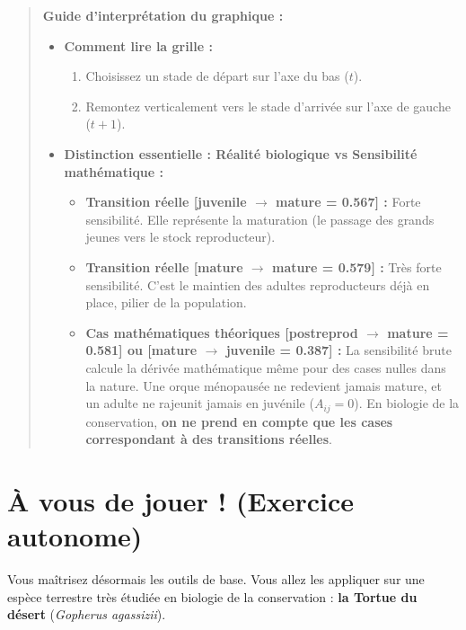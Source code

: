 \documentclass[
  french,
  a4paper,
  DIV=11,
  numbers=noendperiod,
  oneside]{scrreprt}
\providecommand{\tightlist}{%
  \setlength{\itemsep}{0pt}\setlength{\parskip}{0pt}}
\begin{document}
\begin{quote}
\textbf{Guide d'interprétation du graphique :}

\begin{itemize}
\tightlist
\item
  \textbf{Comment lire la grille :}

  \begin{enumerate}
  \def\labelenumi{\arabic{enumi}.}
  \tightlist
  \item
    Choisissez un stade de départ sur l'axe du bas (\(t\)).
  \item
    Remontez verticalement vers le stade d'arrivée sur l'axe de gauche
    (\(t+1\)).
  \end{enumerate}
\item
  \textbf{Distinction essentielle : Réalité biologique vs Sensibilité
  mathématique :}

  \begin{itemize}
  \tightlist
  \item
    \textbf{Transition réelle {[}juvenile \(\to\) mature = 0.567{]} :}
    Forte sensibilité. Elle représente la maturation (le passage des
    grands jeunes vers le stock reproducteur).
  \item
    \textbf{Transition réelle {[}mature \(\to\) mature = 0.579{]} :}
    Très forte sensibilité. C'est le maintien des adultes reproducteurs
    déjà en place, pilier de la population.
  \item
    \textbf{Cas mathématiques théoriques {[}postreprod \(\to\) mature =
    0.581{]} ou {[}mature \(\to\) juvenile = 0.387{]} :} La sensibilité
    brute calcule la dérivée mathématique même pour des cases nulles
    dans la nature. Une orque ménopausée ne redevient jamais mature, et
    un adulte ne rajeunit jamais en juvénile (\(A_{ij} = 0\)). En
    biologie de la conservation, \textbf{on ne prend en compte que les
    cases correspondant à des transitions réelles}.
  \end{itemize}
\end{itemize}
\end{quote}

\section{À vous de jouer ! (Exercice
autonome)}\label{uxe0-vous-de-jouer-exercice-autonome}

Vous maîtrisez désormais les outils de base. Vous allez les appliquer
sur une espèce terrestre très étudiée en biologie de la conservation :
\textbf{la Tortue du désert} (\emph{Gopherus agassizii}).
\end{document}
